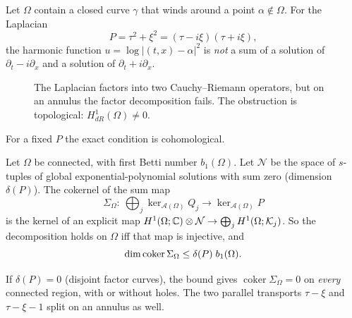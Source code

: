 \begin{proposition}\label{f:prop:holes}
Let $\Omega$ contain a closed curve $\gamma$ that winds around a point $\alpha\notin\Omega$. For the Laplacian
\[
P=\tau^2+\xi^2=(\tau-i\xi)(\tau+i\xi),
\]
the harmonic function $u=\log|(t,x)-\alpha|^2$ is \emph{not} a sum of a solution of $\partial_t-i\partial_x$ and a solution of $\partial_t+i\partial_x$.

\end{proposition}

\begin{figure}[!htb]
\centering
{}
\caption{The Laplacian factors into two Cauchy--Riemann operators, but on an annulus the factor decomposition fails. The obstruction is topological: $H^1_{dR}(\Omega)\neq0$.}\label{f:fig:hole}
\end{figure}

For a fixed $P$ the exact condition is cohomological.

\begin{theorem}\label{thm:cohom}
Let $\Omega$ be connected, with first Betti number $b_1(\Omega)$. Let $\mathcal N$ be the space of $s$-tuples of global exponential-polynomial solutions with sum zero (dimension $\delta(P)$). The cokernel of the sum map
\[
\Sigma_\Omega:\ \bigoplus_j\ker_{\mathcal A(\Omega)}Q_j\to\ker_{\mathcal A(\Omega)}P
\]
is the kernel of an explicit map $H^1(\Omega;\mathbb{C})\otimes\mathcal N\to\bigoplus_jH^1(\Omega;\mathcal K_j)$. So the decomposition holds on $\Omega$ iff that map is injective, and
\[
\operatorname{dim}\operatorname{coker}\Sigma_\Omega\le\delta(P)\;b_1(\Omega).
\]
\end{theorem}

\begin{example}
If $\delta(P)=0$ (disjoint factor curves), the bound gives $\operatorname{coker}\Sigma_\Omega=0$ on \emph{every} connected region, with or without holes. The two parallel transports $\tau-\xi$ and $\tau-\xi-1$ split on an annulus as well.
\end{example}

